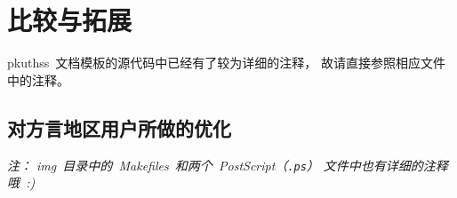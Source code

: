 \chapter{比较与拓展}

pkuthss~文档模板的源代码中已经有了较为详细的注释，
故请直接参照相应文件中的注释。
\section{对方言地区用户所做的优化\label{sec:dialect}}
\emph
{%
	注：%
	img~目录中的~Makefiles~和两个~PostScript（\texttt{.ps}）%
	文件中也有详细的注释哦~:)
}

